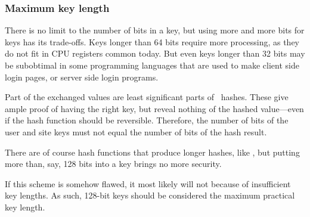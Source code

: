 \subsubsection{Maximum key length}
There is no limit to the number of bits in a key,
but using more and more bits for keys has its trade-offs.
Keys longer than 64 bits require more processing,
as they do not fit in CPU registers common today.
But even keys longer than 32 bits may be subobtimal in some programming languages that are used to make client side login pages,
or server side login programs.
\par
Part of the exchanged values are least significant parts of \SHA\ hashes.
These give ample proof of having the right key,
but reveal nothing of the hashed value---even if the hash function should be reversible.
Therefore,
the number of bits of the user and site keys must not equal the number of bits of the hash result.
\par
There are of course hash functions that produce longer hashes,
like ,
but putting more than,
say,
128 bits into a key brings no more security.
\par
If this scheme is somehow flawed,
it most likely will not because of insufficient key lengths.
As such,
128-bit keys should be considered the maximum practical key length.
